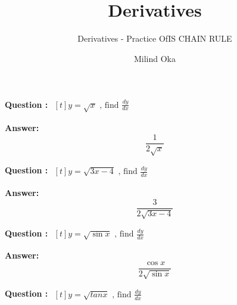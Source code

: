 \documentclass{beamer}
\title{Derivatives}
\subtitle{Derivatives - Practice OfIS  CHAIN RULE}
\author{Milind Oka}
\begin{document}
 

\frame {
		\titlepage
	}

\huge

\frame
{
\textbf{Question :} 
$\begin{aligned}[t] 
y= \sqrt{x}  \text{\ , \  \ find \ \  } \frac{dy}{dx}
\end{aligned}$

}



\frame
{
\textbf{Answer:}
\begin{equation} \nonumber
\frac{1}{2\sqrt{x}}
\end{equation}

}


\frame
{
\textbf{Question :} 
$\begin{aligned}[t] 
y= \sqrt{3x-4}  \text{\ , \  \ find \ \  } \frac{dy}{dx}
\end{aligned}$
}


\frame
{
\textbf{Answer:}
\begin{equation} \nonumber
\frac{3}{2\sqrt{3x-4}}
\end{equation}

}
\frame
{
\textbf{Question :} 
$\begin{aligned}[t] 
y= \sqrt{\sin x}  \text{\ , \  \ find \ \  } \frac{dy}{dx}
\end{aligned}$
}


\frame
{
\textbf{Answer:}
\begin{equation} \nonumber
\frac{\cos x}{2\sqrt{\sin x}}
\end{equation}

}




\frame
{
\textbf{Question :} 
$\begin{aligned}[t] 
y= \sqrt{tan x}  \text{\ , \  \ find \ \  } \frac{dy}{dx}
\end{aligned}$
}
\end{document}

